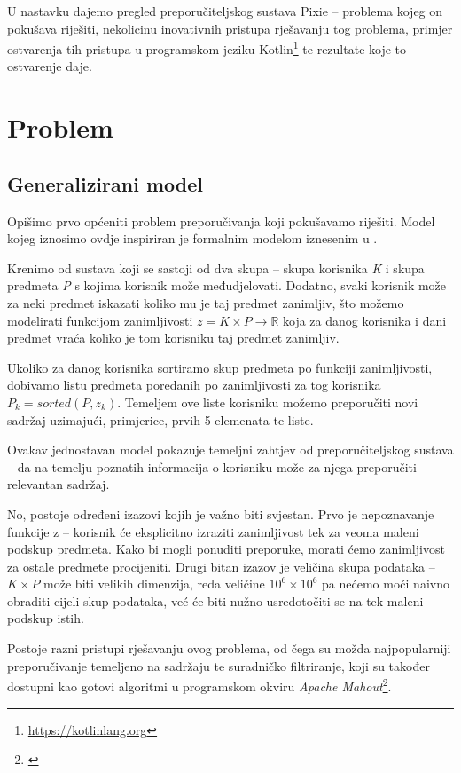 \documentclass[times, utf8, seminar]{fer}
\begin{document}
U nastavku dajemo pregled preporučiteljskog sustava Pixie -- problema kojeg on pokušava riješiti, nekolicinu inovativnih pristupa rješavanju tog problema, primjer ostvarenja tih pristupa u programskom jeziku Kotlin\footnote{\url{https://kotlinlang.org}} te rezultate koje to ostvarenje daje.

\chapter{Problem}

\section{Generalizirani model}
Opišimo prvo općeniti problem preporučivanja koji pokušavamo riješiti. Model kojeg iznosimo ovdje inspiriran je formalnim modelom iznesenim u \cite{avsp-recommender}.

Krenimo od sustava koji se sastoji od dva skupa -- skupa korisnika \textit{K} i skupa predmeta \textit{P} s kojima korisnik može međudjelovati. Dodatno, svaki korisnik može za neki predmet iskazati koliko mu je taj predmet zanimljiv, što možemo modelirati funkcijom zanimljivosti $z = K \times P \to \mathbb{R}$ koja za danog korisnika i dani predmet vraća koliko je tom korisniku taj predmet zanimljiv.

Ukoliko za danog korisnika sortiramo skup predmeta po funkciji zanimljivosti, dobivamo listu predmeta poredanih po zanimljivosti za tog korisnika $P_k = sorted(P, z_k)$. Temeljem ove liste korisniku možemo preporučiti novi sadržaj uzimajući, primjerice, prvih 5 elemenata te liste.

Ovakav jednostavan model pokazuje temeljni zahtjev od preporučiteljskog sustava -- da na temelju poznatih informacija o korisniku može za njega preporučiti relevantan sadržaj. 

No, postoje određeni izazovi kojih je važno biti svjestan. Prvo je nepoznavanje funkcije z -- korisnik će eksplicitno izraziti zanimljivost tek za veoma maleni podskup predmeta. Kako bi mogli ponuditi preporuke, morati ćemo zanimljivost za ostale predmete procijeniti. Drugi bitan izazov je veličina skupa podataka -- $K \times P$ može biti velikih dimenzija, reda veličine $10^6 \times 10^6$ pa nećemo moći naivno obraditi cijeli skup podataka, već će biti nužno usredotočiti se na tek maleni podskup istih.

Postoje razni pristupi rješavanju ovog problema, od čega su možda najpopularniji preporučivanje temeljeno na sadržaju te suradničko filtriranje, koji su također dostupni kao gotovi algoritmi u programskom okviru \textit{Apache Mahout}\footnote{\cite{rovkp-mahout}}.
\end{document}
